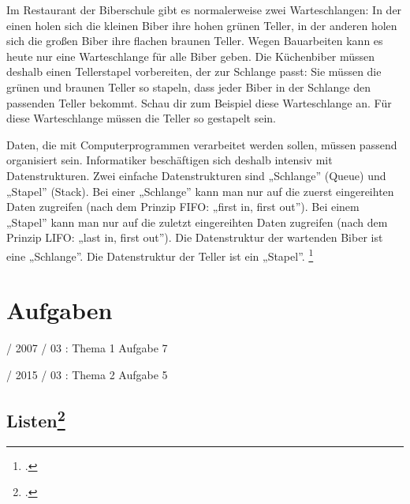 \documentclass{lehramt-informatik}
\begin{document}
Im Restaurant der Biberschule gibt es normalerweise zwei Warteschlangen:
In der einen holen sich die kleinen Biber ihre hohen grünen Teller, in
der anderen holen sich die großen Biber ihre flachen braunen Teller.
Wegen Bauarbeiten kann es heute nur eine Warteschlange für alle Biber
geben. Die Küchenbiber müssen deshalb einen Tellerstapel vorbereiten,
der zur Schlange passt: Sie müssen die grünen und braunen Teller so
stapeln, dass jeder Biber in der Schlange den passenden Teller bekommt.
Schau dir zum Beispiel diese Warteschlange an. Für diese Warteschlange
müssen die Teller so gestapelt sein.

Daten, die mit Computerprogrammen verarbeitet werden sollen, müssen
passend organisiert sein. Informatiker beschäftigen sich deshalb
intensiv mit Datenstrukturen. Zwei einfache Datenstrukturen sind
„Schlange” (Queue) und „Stapel” (Stack). Bei einer „Schlange” kann man
nur auf die zuerst eingereihten Daten zugreifen (nach dem Prinzip FIFO:
„first in, first out”). Bei einem „Stapel” kann man nur auf die zuletzt
eingereihten Daten zugreifen (nach dem Prinzip LIFO: „last in, first
out”). Die Datenstruktur der wartenden Biber ist eine „Schlange”. Die
Datenstruktur der Teller ist ein „Stapel”.
\footcite[Seite 35]{net:pdf:informatik-biber-2010}


\chapter{Aufgaben}

%

 / 2007 / 03 : Thema 1 Aufgabe 7

%

 / 2015 / 03 : Thema 2 Aufgabe 5

%

\section{Listen\footcite[Aufgabe 3]{aud:e-klausur}}
\end{document}
